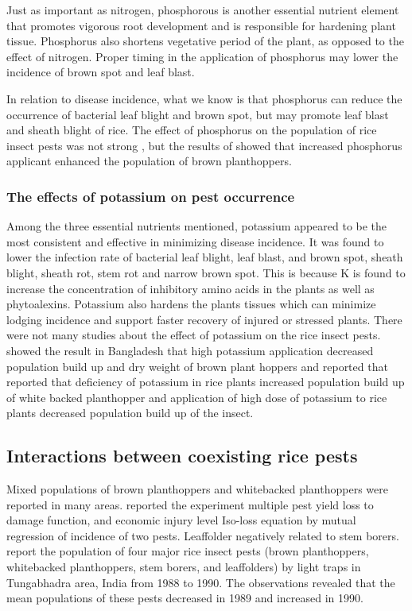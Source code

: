 Just as important as nitrogen, phosphorous is another essential nutrient element that promotes vigorous root development and is responsible for hardening plant tissue. Phosphorus also shortens vegetative period of the plant, as opposed to the effect of nitrogen. Proper timing in the application of phosphorus may lower the incidence of brown spot and leaf blast.

In relation to disease incidence, what we know is that phosphorus can reduce the occurrence of bacterial leaf blight and brown spot, but may promote leaf blast and sheath blight of rice. The effect of phosphorus on the population of rice insect pests was not strong \citep{Chau_2003_Impacts, Rashid_2014_Effect}, but the results of \cite{Rashid_2014_Effect} showed that increased phosphorus applicant enhanced the population of brown planthoppers.

\subsubsection{The effects of potassium on pest occurrence}

Among the three essential nutrients mentioned, potassium appeared to be the most consistent and effective in minimizing disease incidence. It was found to lower the infection rate of bacterial leaf blight, leaf blast, and brown spot, sheath blight, sheath rot, stem rot and narrow brown spot. This is because K is found to increase the concentration of inhibitory amino acids in the plants as well as phytoalexins. Potassium also hardens the plants tissues which can minimize lodging incidence and support faster recovery of injured or stressed plants. There were not many studies about the effect of potassium on the rice insect pests. \cite{Rashid_2014_Effect} showed the result in Bangladesh that high potassium application decreased population build up and dry weight of brown plant hoppers and \cite{Salim_2002_Effects} reported that reported that deficiency of potassium in rice plants increased population build up of white backed planthopper and application of high dose of potassium to rice plants decreased population build up of the insect.

\subsection*{Interactions between coexisting rice pests}

Mixed populations of brown planthoppers and whitebacked planthoppers were reported in many areas. \cite{Naganagoud_2010_Studies} reported the experiment multiple pest yield loss to damage function, and economic injury level Iso-loss equation by mutual regression of incidence of two pests. Leaffolder negatively related to stem borers. \cite{Selvaraj_2012_Determination} report the population of four major rice insect pests (brown planthoppers, whitebacked planthoppers, stem borers, and leaffolders) by light traps in Tungabhadra area, India from 1988 to 1990. The observations revealed that the mean populations of these pests decreased in 1989 and increased in 1990.

